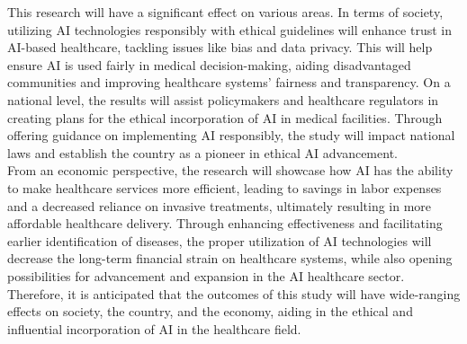 \documentclass[a4paper, 12pt]{article}
\begin{document}
This research will have a significant effect on various areas. In terms of society, utilizing AI technologies responsibly with ethical guidelines will enhance trust in AI-based healthcare, tackling issues like bias and data privacy. This will help ensure AI is used fairly in medical decision-making, aiding disadvantaged communities and improving healthcare systems' fairness and transparency. On a national level, the results will assist policymakers and healthcare regulators in creating plans for the ethical incorporation of AI in medical facilities. Through offering guidance on implementing AI responsibly, the study will impact national laws and establish the country as a pioneer in ethical AI advancement.\\

From an economic perspective, the research will showcase how AI has the ability to make healthcare services more efficient, leading to savings in labor expenses and a decreased reliance on invasive treatments, ultimately resulting in more affordable healthcare delivery. Through enhancing effectiveness and facilitating earlier identification of diseases, the proper utilization of AI technologies will decrease the long-term financial strain on healthcare systems, while also opening possibilities for advancement and expansion in the AI healthcare sector.\\

Therefore, it is anticipated that the outcomes of this study will have wide-ranging effects on society, the country, and the economy, aiding in the ethical and influential incorporation of AI in the healthcare field.
\end{document}
